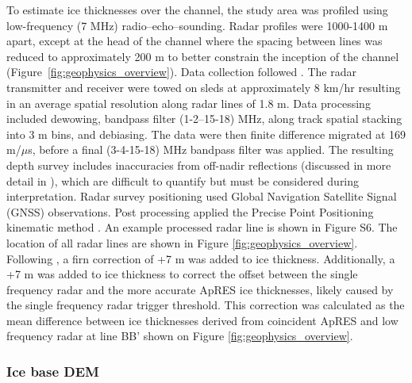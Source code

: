 To estimate ice thicknesses over the channel, the study area was profiled using low-frequency (7 MHz) radio--echo--sounding.  Radar profiles were 1000-1400 m apart, except at the head of the channel where the spacing between lines was reduced to approximately 200 m to better constrain the inception of the channel (Figure~\ref{fig:geophysics_overview}). %
Data collection followed \cite{christianson2016basal}. The radar transmitter and receiver were towed on sleds at approximately 8 km/hr resulting in an average spatial resolution along radar lines of 1.8 m. Data processing included dewowing, bandpass filter (1-2--15-18) MHz, along track spatial stacking into 3 m bins, and debiasing. The data were then finite difference migrated at 169 m/$\mu$s, before a final (3-4-15-18) MHz bandpass filter was applied. The resulting depth survey includes inaccuracies from off-nadir reflections (discussed in more detail in \cite{christianson2016basal}), which are difficult to quantify but must be considered during interpretation.  Radar survey positioning used Global Navigation Satellite Signal (GNSS) observations. Post processing applied the Precise Point Positioning kinematic method \citep{ppp2016}. An example processed radar line is shown in Figure S6. The location of all radar lines are shown in Figure \ref{fig:geophysics_overview}.
Following \cite{dowdeswell2004investigations}, a firn correction of +7 m was added to ice thickness. Additionally, a +7 m was added to ice thickness to correct the offset between the single frequency radar and the more accurate ApRES ice thicknesses, likely caused by the single frequency radar trigger threshold. This correction was calculated as the mean difference between ice thicknesses derived from coincident ApRES and low frequency radar at line BB' shown on Figure \ref{fig:geophysics_overview}.

\subsubsection{Ice base DEM} \label{sec:interp}

